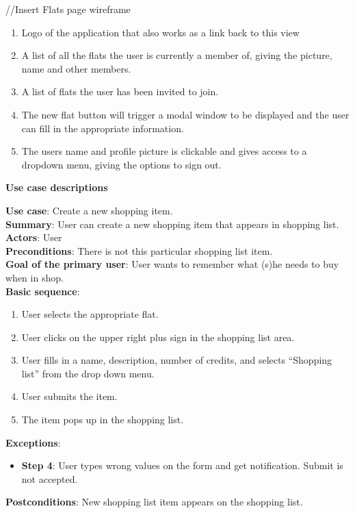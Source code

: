 \documentclass{sig-alt-release2}
\begin{document}
//Insert Flats page wireframe
\begin{enumerate}
\item Logo of the application that also works as a link back to this view
\item A list of all the flats the user is currently a member of, giving the picture, name and other members. 
\item A list of flats the user has been invited to join. 
\item The new flat button will trigger a modal window to be displayed and the user can fill in the appropriate information.
\item The users name and profile picture is clickable and gives access to a dropdown menu, giving the options to sign out.
\end{enumerate}

\textbf{Use case descriptions}

\textbf{Use case}: Create a new shopping item.\\
\textbf{Summary}: User can create a new shopping item that appears in shopping list.\\
\textbf{Actors}: User \\
\textbf{Preconditions}: There is not this particular shopping list item. \\
\textbf{Goal of the primary user}: User wants to remember what (s)he needs to buy when in shop. \\
\textbf{Basic sequence}:
\begin{enumerate}
\item User selects the appropriate flat.
\item User clicks on the upper right plus sign in the shopping list area. 
\item User fills in a name, description, number of credits, and selects “Shopping list” from the drop down menu. 
\item User submits the item.
\item The item pops up in the shopping list.
\end{enumerate}
\textbf{Exceptions}:
\begin{itemize}
\item \textbf{Step 4}: User types wrong values on the form and get notification. Submit is not accepted.
\end{itemize}
\textbf{Postconditions}: New shopping list item appears on the shopping list. \\
\end{document}

